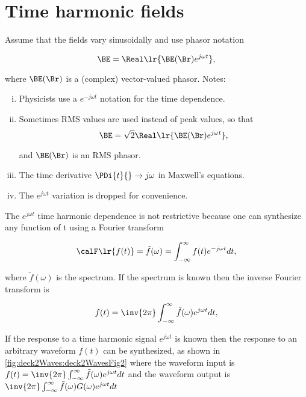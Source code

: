 \section{Time harmonic fields}

Assume that the fields vary sinusoidally and use phasor notation

\begin{equation}\label{eqn:uwavesLecture2:680}
\BE = \Real\lr{ \BE(\Br) e^{j \omega t} },
\end{equation}

where \( \BE(\Br) \) is a (complex) vector-valued phasor.  Notes:

\begin{enumerate}[(i)]
\item Physicists use a \( e^{-j \omega t} \) notation for the time dependence.
\item Sometimes RMS values are used instead of peak values, so that
\begin{equation}\label{eqn:uwavesLecture2:700}
\BE = \sqrt{2} \Real\lr{ \BE(\Br) e^{j \omega t} },
\end{equation}

and \( \BE(\Br) \) is an RMS phasor.
\item The time derivative \( \PDi{t}{} \rightarrow j\omega \) in Maxwell's equations.
\item The \( e^{j \omega t} \) variation is dropped for convenience.
\end{enumerate}

The \( e^{j \omega t} \) time harmonic dependence is not restrictive because one can synthesize any function of t using a Fourier transform

\begin{equation}\label{eqn:uwavesLecture2:720}
\calF \lr{ f(t) } = \tilde{f}(\omega) = \int_{-\infty}^\infty f(t) e^{-j \omega t} dt,
\end{equation}

where \( \tilde{f}(\omega) \) is the spectrum.  If the spectrum is known then the inverse Fourier transform is

\begin{equation}\label{eqn:uwavesLecture2:740}
f(t) = \inv{2 \pi} \int_{-\infty}^\infty \tilde{f}(\omega) e^{j \omega t} dt,
\end{equation}

If the response to a time harmonic signal \( e^{j \omega t} \) is known then the response to an arbitrary waveform \( f(t) \) can be synthesized, as shown in
\cref{fig:deck2Waves:deck2WavesFig2}
where the waveform input is \( f(t) = \inv{2 \pi} \int_{-\infty}^\infty \tilde{f}(\omega) e^{j \omega t} dt \) and the waveform output is \( \inv{2 \pi} \int_{-\infty}^\infty \tilde{f}(\omega) G(\omega) e^{j \omega t} dt \)

